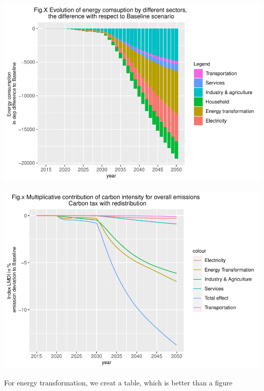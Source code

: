 \documentclass[
]{article}
\begin{document}
\includegraphics{Modele-ThreeMe-Tunisie_Sequeira_Valilou_Wang_files/figure-latex/unnamed-chunk-20-1.pdf}

\includegraphics{Modele-ThreeMe-Tunisie_Sequeira_Valilou_Wang_files/figure-latex/unnamed-chunk-21-1.pdf}

For energy transformation, we creat a table, which is better than a
figure
\end{document}
